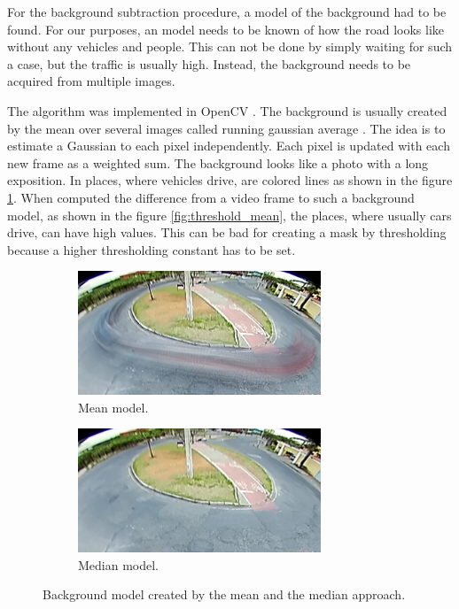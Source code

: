 \documentclass[a4paper,11pt,titlepage,twoside]{article}
\numberwithin{figure}{section}
\begin{document}
For the background subtraction procedure, a model of the background had to be found. For our purposes, an model needs to be known of how the road looks like without any vehicles and people. This can not be done by simply waiting for such a case, but the traffic is usually high. Instead, the background needs to be acquired from multiple images. 

The algorithm was implemented in OpenCV \cite{opencv}. The background is usually created by the mean over several images called running gaussian average \cite{wren1997pfinder}. The idea is to estimate a Gaussian to each pixel independently. Each pixel is updated with each new frame as a weighted sum. The background looks like a photo with a long exposition. In places, where vehicles drive, are colored lines as shown in the figure \ref{fig:cut_mean}. When computed the difference from a video frame to such a background model, as shown in the figure \ref{fig:threshold_mean}, the places, where usually cars drive, can have high values. This can be bad for creating a mask by thresholding because a higher thresholding constant has to be set.

\begin{figure}
    \begin{subfigure}[Sample1]{0.5\linewidth}
        \includegraphics[height=37mm]{fig/background_mean_crop.png}
        \caption{Mean model.}
        \label{fig:cut_mean}
    \end{subfigure}
    \qquad
    \begin{subfigure}[Sample1]{0.5\linewidth}    
        \includegraphics[height=37mm]{fig/background_med_crop.png}  
        \caption{Median model.}
        \label{fig:cut_med}  
    \end{subfigure} 
    \caption{Background model created by the mean and the median approach.}
    \label{fig:roundabout}
\end{figure}
\end{document}
